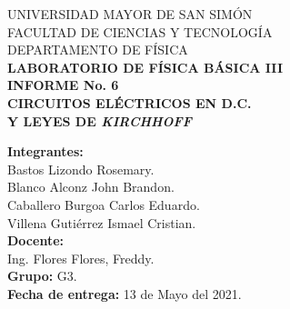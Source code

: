 \documentclass[letter,11pt]{article}
\begin{document}
\begin{titlepage}
\begin{center}
{\Large UNIVERSIDAD MAYOR DE SAN SIMÓN}\\
\vspace*{0.15cm}
{\large FACULTAD DE CIENCIAS Y TECNOLOGÍA}\\
\vspace*{0.10cm}
DEPARTAMENTO DE FÍSICA\\
\vspace*{3.0cm}
{\Large \textbf{LABORATORIO DE FÍSICA BÁSICA III}}\\
\vspace*{0.3cm}
{\Large \textbf{INFORME No. 6}}\\
\vspace*{3.5cm}
{\Large \textbf{CIRCUITOS ELÉCTRICOS EN D.C. \\ Y LEYES DE \emph{KIRCHHOFF}}}\\
\end{center}

\vspace*{5.8cm}
\leftskip=7.95cm
\noindent
\textbf{Integrantes:}\\
Bastos Lizondo Rosemary.\\
Blanco Alconz John Brandon.\\
Caballero Burgoa Carlos Eduardo.\\
Villena Gutiérrez Ismael Cristian.\\
\newline
\textbf{Docente:}\\
Ing. Flores Flores, Freddy.\\
\newline
\textbf{Grupo:} G3.\\
\textbf{Fecha de entrega:} 13 de Mayo del 2021.\\

\end{titlepage}
\end{document}
